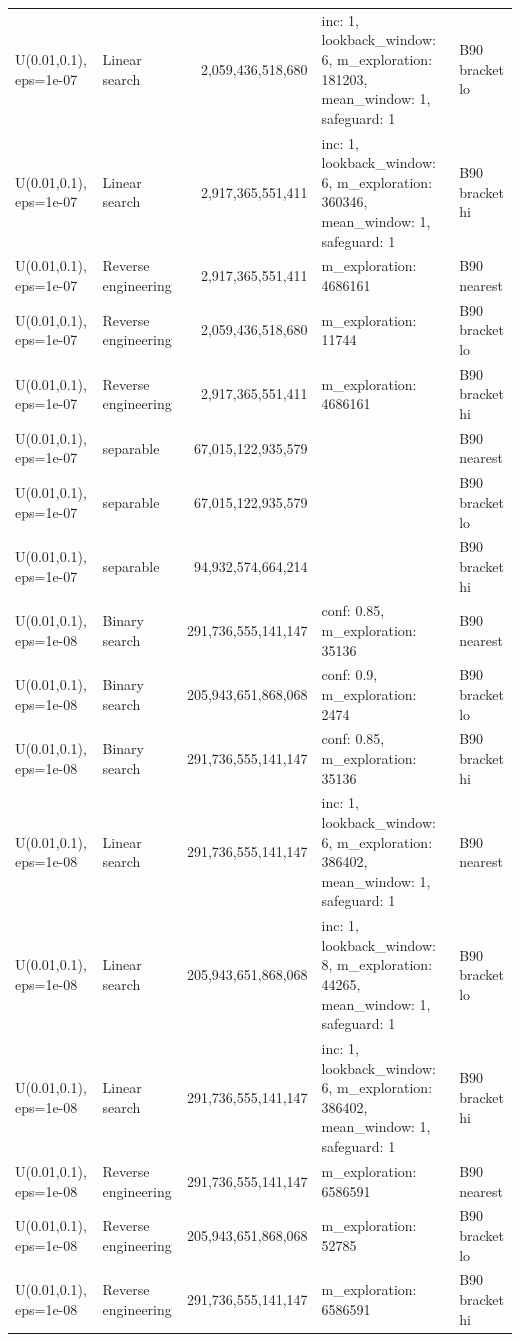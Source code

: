 \begin{tabular}{llrll}
U(0.01,0.1), eps=1e-07 & Linear search & 2,059,436,518,680 & inc: 1, lookback\_window: 6, m\_exploration: 181203, mean\_window: 1, safeguard: 1 & B90 bracket lo \\
U(0.01,0.1), eps=1e-07 & Linear search & 2,917,365,551,411 & inc: 1, lookback\_window: 6, m\_exploration: 360346, mean\_window: 1, safeguard: 1 & B90 bracket hi \\
U(0.01,0.1), eps=1e-07 & Reverse engineering & 2,917,365,551,411 & m\_exploration: 4686161 & B90 nearest \\
U(0.01,0.1), eps=1e-07 & Reverse engineering & 2,059,436,518,680 & m\_exploration: 11744 & B90 bracket lo \\
U(0.01,0.1), eps=1e-07 & Reverse engineering & 2,917,365,551,411 & m\_exploration: 4686161 & B90 bracket hi \\
U(0.01,0.1), eps=1e-07 & separable & 67,015,122,935,579 &  & B90 nearest \\
U(0.01,0.1), eps=1e-07 & separable & 67,015,122,935,579 &  & B90 bracket lo \\
U(0.01,0.1), eps=1e-07 & separable & 94,932,574,664,214 &  & B90 bracket hi \\
U(0.01,0.1), eps=1e-08 & Binary search & 291,736,555,141,147 & conf: 0.85, m\_exploration: 35136 & B90 nearest \\
U(0.01,0.1), eps=1e-08 & Binary search & 205,943,651,868,068 & conf: 0.9, m\_exploration: 2474 & B90 bracket lo \\
U(0.01,0.1), eps=1e-08 & Binary search & 291,736,555,141,147 & conf: 0.85, m\_exploration: 35136 & B90 bracket hi \\
U(0.01,0.1), eps=1e-08 & Linear search & 291,736,555,141,147 & inc: 1, lookback\_window: 6, m\_exploration: 386402, mean\_window: 1, safeguard: 1 & B90 nearest \\
U(0.01,0.1), eps=1e-08 & Linear search & 205,943,651,868,068 & inc: 1, lookback\_window: 8, m\_exploration: 44265, mean\_window: 1, safeguard: 1 & B90 bracket lo \\
U(0.01,0.1), eps=1e-08 & Linear search & 291,736,555,141,147 & inc: 1, lookback\_window: 6, m\_exploration: 386402, mean\_window: 1, safeguard: 1 & B90 bracket hi \\
U(0.01,0.1), eps=1e-08 & Reverse engineering & 291,736,555,141,147 & m\_exploration: 6586591 & B90 nearest \\
U(0.01,0.1), eps=1e-08 & Reverse engineering & 205,943,651,868,068 & m\_exploration: 52785 & B90 bracket lo \\
U(0.01,0.1), eps=1e-08 & Reverse engineering & 291,736,555,141,147 & m\_exploration: 6586591 & B90 bracket hi \\

\end{tabular}
